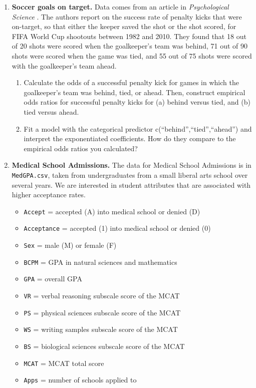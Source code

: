 \documentclass[
]{krantz}
\providecommand{\tightlist}{%
  \setlength{\itemsep}{0pt}\setlength{\parskip}{0pt}}
\begin{document}
\begin{enumerate}
\def\labelenumi{\arabic{enumi}.}
\item
  \textbf{Soccer goals on target.} Data comes from an article in \emph{Psychological Science} \citep{Roskes2011}. The authors report on the success rate of penalty kicks that were on-target, so that either the keeper saved the shot or the shot scored, for FIFA World Cup shootouts between 1982 and 2010. They found that 18 out of 20 shots were scored when the goalkeeper's team was behind, 71 out of 90 shots were scored when the game was tied, and 55 out of 75 shots were scored with the goalkeeper's team ahead.

  \begin{enumerate}
  \def\labelenumii{\alph{enumii}.}
  \item
    Calculate the odds of a successful penalty kick for games in which the goalkeeper's team was behind, tied, or ahead. Then, construct empirical odds ratios for successful penalty kicks for (a) behind versus tied, and (b) tied versus ahead.
  \item
    Fit a model with the categorical predictor c(``behind'',``tied'',``ahead'') and interpret the exponentiated coefficients. How do they compare to the empirical odds ratios you calculated?
  \end{enumerate}
\item
  \textbf{Medical School Admissions.} The data for Medical School Admissions is in \texttt{MedGPA.csv}, taken from undergraduates from a small liberal arts school over several years. We are interested in student attributes that are associated with higher acceptance rates.

  \begin{itemize}
  \tightlist
  \item
    \texttt{Accept} = accepted (A) into medical school or denied (D)
  \item
    \texttt{Acceptance} = accepted (1) into medical school or denied (0)
  \item
    \texttt{Sex} = male (M) or female (F)
  \item
    \texttt{BCPM} = GPA in natural sciences and mathematics
  \item
    \texttt{GPA} = overall GPA
  \item
    \texttt{VR} = verbal reasoning subscale score of the MCAT
  \item
    \texttt{PS} = physical sciences subscale score of the MCAT
  \item
    \texttt{WS} = writing samples subscale score of the MCAT
  \item
    \texttt{BS} = biological sciences subscale score of the MCAT
  \item
    \texttt{MCAT} = MCAT total score
  \item
    \texttt{Apps} = number of schools applied to
  \end{itemize}


\end{enumerate}
\end{document}
